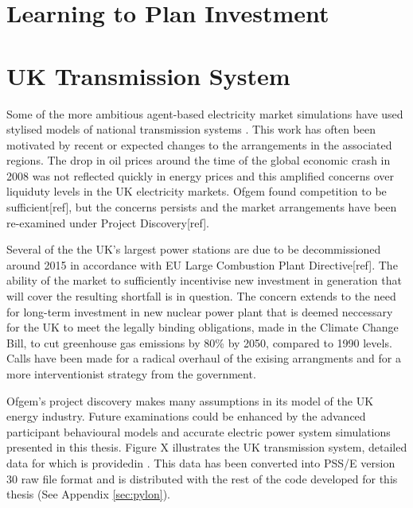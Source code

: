 \section{Learning to Plan Investment}

\section{UK Transmission System}
Some of the more ambitious agent-based electricity market simulations have used
stylised models of national transmission systems
\cite{cincotti:09,weidlich:06}.  This work has often been motivated by recent
or expected changes to the arrangements in the associated regions.  The drop in
oil prices around the time of the global economic crash in 2008 was not
reflected quickly in energy prices and this amplified concerns over liquiduty
levels in the UK electricity markets.  Ofgem found competition to be
sufficient[ref], but the concerns persists and the market arrangements have
been re-examined under Project Discovery[ref].

Several of the the UK's largest power stations are due to be decommissioned
around 2015 in accordance with EU Large Combustion Plant Directive[ref].  The
ability of the market to sufficiently incentivise new investment in generation that will cover the
resulting shortfall is in question.  The concern extends to the need for
long-term investment in new nuclear power plant that is deemed neccessary for
the UK to meet the legally binding obligations, made in the Climate Change
Bill, to cut greenhouse gas emissions by 80\% by 2050, compared to 1990 levels.
Calls have been made for a radical overhaul of the exising arrangments and for
a more interventionist strategy from the government.

Ofgem's project discovery makes many assumptions in its model of the UK
energy industry.  Future examinations could be enhanced by the advanced
participant behavioural models and accurate electric power system simulations
presented in this thesis.  Figure X illustrates the UK transmission system,
detailed data for which is providedin .  This data has been
converted into PSS/E version 30 raw file format and is distributed with the
rest of the code developed for this thesis (See Appendix \ref{sec:pylon}).

